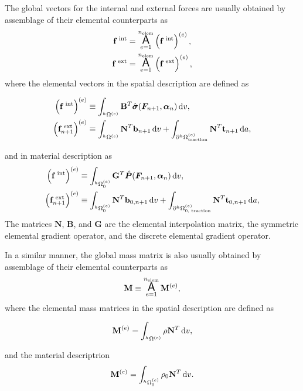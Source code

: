 The global vectors for the internal and external forces are usually obtained by assemblage of their elemental counterparts as
\begin{gather}
    \mathbf f^\text{\;int} = \operatorname*{\text{\Large $ \mathsf{A} $}}_{e=1}^{n_\text{elem}} \left(\mathbf f^\text{\;int}\right)^{(e)},\\
    \mathbf f^\text{\;ext} = \operatorname*{\text{\Large $ \mathsf{A} $}}_{e=1}^{n_\text{elem}} \left(\mathbf f^\text{\;ext}\right)^{(e)},
\end{gather}
where the elemental vectors in the spatial description are defined as
\begin{highlight}[innertopmargin=-5pt]
    \begin{align}
        \left(\mathbf f^\text{\;int}\right)^{(e)} &\equiv \int_{^h\Omega^{(e)}} \mathbf B^T \hat{\bm{\sigma} }(\bm{F}_{n+1},\bm{\alpha}_n)\,\mathrm{d} v,\\
        \left(\mathbf f^\text{\;ext}_{n+1}\right)^{(e)} &\equiv \int_{^h\Omega^{(e)}}\mathbf N^T \mathbf b_{n+1}\,\mathrm{d} v + \int_{\partial^h\Omega_\text{traction}^{(e)}} \mathbf N^T \mathbf t_{n+1}\,\mathrm{d} a,
    \end{align}
\end{highlight}
and in material description as
    \begin{align}
        \left(\mathbf f^\text{\;int}\right)^{(e)} &\equiv \int_{^h\Omega_0^{(e)}} \mathbf G^T \hat{\bm{P} }(\bm{F}_{n+1},\bm{\alpha}_n)\,\mathrm{d} v,\\
        \left(\mathbf f^\text{\;ext}_{n+1}\right)^{(e)} &\equiv \int_{^h\Omega_0^{(e)}}\mathbf N^T \mathbf b_{0,n+1}\,\mathrm{d} v + \int_{\partial^h\Omega_\text{0, traction}^{(e)}} \mathbf N^T \mathbf t_{0,n+1}\,\mathrm{d} a,
    \end{align}
The matrices $\mathbf N$, $\mathbf B$, and $\mathbf G$ are the elemental interpolation matrix, the symmetric elemental gradient operator, and the discrete elemental gradient operator.

In a similar manner, the global mass matrix is also usually obtained by assemblage of their elemental counterparts as
\begin{equation}
  \mathbf M \equiv \operatorname*{\text{\Large $ \mathsf{A} $}}_{e=1}^{n_\text{elem}} \mathbf M^{(e)},
\end{equation}
where the elemental mass matrices in the spatial description are defined as
\begin{highlight}
  \begin{equation}
    \mathbf M^{(e)} = \int_{^h\Omega^{(e)}} \rho \mathbf N^T\,\mathrm{d} v,
  \end{equation}
\end{highlight}
and the material descriptrion
\begin{equation}
  \mathbf M^{(e)} = \int_{^h\Omega_0^{(e)}} \rho_0\mathbf N^T \,\mathrm{d} v.
\end{equation}

